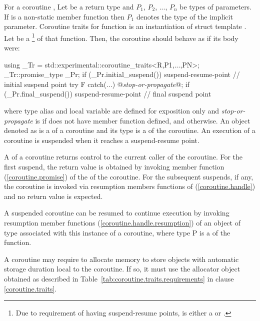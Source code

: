 \pnum
For a coroutine , Let  be a return type and $P_1$, $P_2$, ..., $P_n$
be types of parameters. If  is a non-static member function then $P_1$ denotes the type of the implicit  parameter. 
Coroutine traits for function  is an instantiation of
struct template .
Let  be a 
\footnote{
Due to requirement of having suspend-resume points,
 is either a
 or 
.
}
of that function. Then, the coroutine 
should behave as if its body were:
\begin{codeblock}
  {
     using _Tr = std::experimental::coroutine_traits<R,P1,...,PN>;
     _Tr::promise_type _Pr;
     if (_Pr.initial_suspend()) {
       suspend-resume-point // initial suspend point
     }
     try { F }
     catch(...) {
       @\textit{stop-or-propagate}@;
     }
     if (_Pr.final_suspend()) {
       suspend-resume-point // final suspend point
     }
  }
\end{codeblock}
where type alias  and local variable  are 
defined for
exposition only and
\textit{stop-or-propagate} is  
if  does not have  member function defined, and  otherwise. An object denoted as  is a  of
a coroutine and its type is a 
of the coroutine.
An execution of a coroutine is suspended when it reaches a suspend-resume point.

\pnum 
A  of a coroutine returns control to the current
caller of the coroutine. For the first suspend, the return value is obtained by invoking member function 
 (\ref{coroutine.promise})
of the  of the coroutine.
For the subsequent suspends, if any, the coroutine
is invoked via resumption members functions of
 (\ref{coroutine.handle}) and no return value is expected.

\pnum
A suspended coroutine can be resumed
to continue execution by invoking
resumption member functions (\ref{coroutine.handle.resumption}) of an object of  type
associated with this instance of a coroutine, where type P
is a  of the function. 

\pnum
A coroutine may require to allocate
memory to store objects with automatic storage duration
local to the coroutine. If so, it must
use the allocator object obtained as described in 
Table~\ref{tab:coroutine.traits.requirements} in clause \ref{coroutine.traits}.

